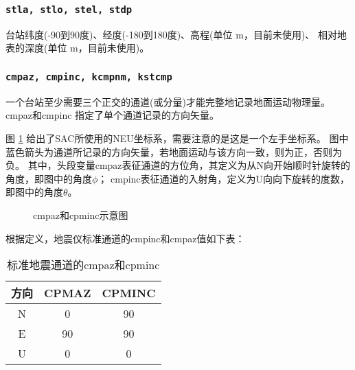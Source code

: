 \subsubsection{\texttt{stla, stlo, stel, stdp}}
台站纬度(-90到90度)、经度(-180到180度)、高程(单位 \si{m}，目前未使用)、
相对地表的深度(单位 \si{m}，目前未使用)。

\subsubsection{\texttt{cmpaz, cmpinc, kcmpnm, kstcmp}}
一个台站至少需要三个正交的通道(或分量)才能完整地记录地面运动物理量。cmpaz和cmpinc
指定了单个通道记录的方向矢量。

图 \ref{fig:cmpaz-cmpinc} 给出了SAC所使用的NEU坐标系，需要注意的是这是一个左手坐标系。
图中蓝色箭头为通道所记录的方向矢量，若地面运动与该方向一致，则为正，否则为负。
其中，头段变量cmpaz表征通道的方位角，其定义为从N向开始顺时针旋转的角度，即图中的角度$\phi$；
cmpinc表征通道的入射角，定义为U向向下旋转的度数，即图中的角度$\theta$。

\begin{figure}[H]
\centering
{}
\caption{cmpaz和cpminc示意图}
\label{fig:cmpaz-cmpinc}
\end{figure}

根据定义，地震仪标准通道的cmpinc和cmpaz值如下表：
\begin{table}[H]
\caption{标准地震通道的cmpaz和cpminc}
\label{table:neu-cmpaz-cmpinc}
\centering
\begin{tabular}{ccc}
\toprule
方向    &   CPMAZ   &   CPMINC      \\
\midrule
N       &   0       &   90          \\
E       &   90      &   90          \\
U       &   0       &   0           \\
\bottomrule
\end{tabular}
\end{table}

